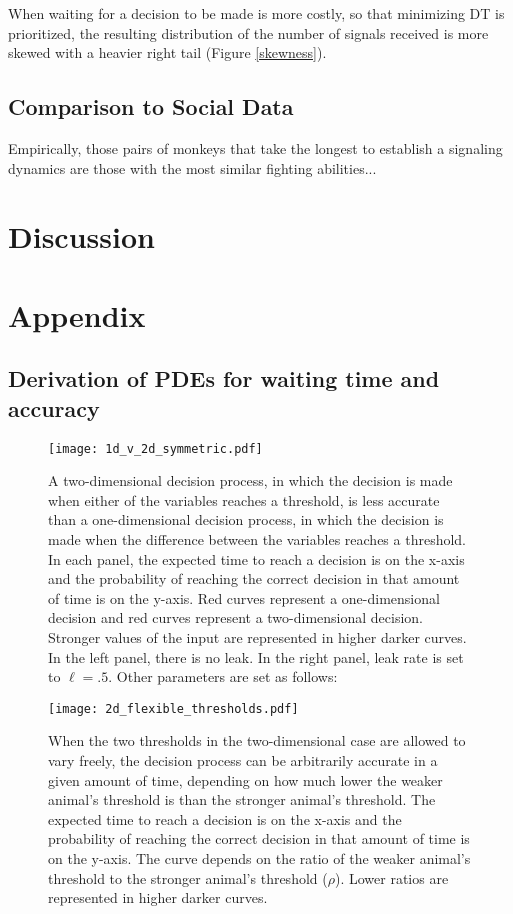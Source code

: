 \documentclass{article}
\begin{document}
When waiting for a decision to be made is more costly, so that minimizing DT is prioritized, the resulting distribution of the number of signals received is more skewed with a heavier right tail (Figure \ref{skewness}).

\subsection{Comparison to Social Data }
Empirically, those pairs of monkeys that take the longest to establish a signaling dynamics are those with the most similar fighting abilities...

\section{Discussion}


\section{Appendix}

\subsection{Derivation of PDEs for waiting time and accuracy \label{pdes_deriv}}

\begin{figure}
\texttt{[image: 1d\_v\_2d\_symmetric.pdf]}
\caption{\label{1dv2d} A two-dimensional decision process, in which the decision is made when either of the variables reaches a threshold, is less accurate than a one-dimensional decision process, in which the decision is made when the difference between the variables reaches a threshold.  In each panel, the expected time to reach a decision is on the x-axis and the probability of reaching the correct decision in that amount of time is on the y-axis.  Red curves represent a one-dimensional decision and red curves represent a two-dimensional decision.  Stronger values of the input are represented in higher darker curves.  In the left panel, there is no leak.  In the right panel, leak rate is set to $\ell=.5$.  Other parameters are set as follows:}
\end{figure}

\begin{figure}
\texttt{[image: 2d\_flexible\_thresholds.pdf]}
\caption{\label{2dthresh} When the two thresholds in the two-dimensional case are allowed to vary freely, the decision process can be arbitrarily accurate in a given amount of time, depending on how much lower the weaker animal's threshold is than the stronger animal's threshold.  The expected time to reach a decision is on the x-axis and the probability of reaching the correct decision in that amount of time is on the y-axis.  The curve depends on the ratio of the weaker animal's threshold to the stronger animal's threshold ($\rho$).  Lower ratios are represented in higher darker curves.}
\end{figure}
\end{document}
